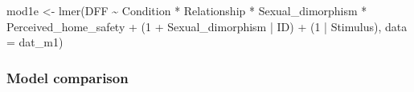 \documentclass[
  bookmarksnumbered]{article}
\newenvironment{Shaded}{\begin{snugshade}}{\end{snugshade}}
\newcommand{\AttributeTok}[1]{\textcolor[rgb]{0.80,0.80,0.80}{#1}}
\newcommand{\DecValTok}[1]{\textcolor[rgb]{0.86,0.86,0.80}{#1}}
\newcommand{\FunctionTok}[1]{\textcolor[rgb]{0.94,0.94,0.56}{#1}}
\newcommand{\NormalTok}[1]{\textcolor[rgb]{0.80,0.80,0.80}{#1}}
\newcommand{\OtherTok}[1]{\textcolor[rgb]{0.94,0.94,0.56}{#1}}
\newcommand{\SpecialCharTok}[1]{\textcolor[rgb]{0.86,0.64,0.64}{#1}}
\newcommand{\StringTok}[1]{\textcolor[rgb]{0.80,0.58,0.58}{#1}}
\begin{document}
\begin{Shaded}
\begin{Highlighting}[]
\NormalTok{mod1e }\OtherTok{\textless{}{-}} \FunctionTok{lmer}\NormalTok{(DFF }\SpecialCharTok{\textasciitilde{}}
\NormalTok{                Condition }\SpecialCharTok{*}\NormalTok{ Relationship }\SpecialCharTok{*}\NormalTok{ Sexual\_dimorphism }\SpecialCharTok{*}\NormalTok{ Perceived\_home\_safety }\SpecialCharTok{+}
\NormalTok{                (}\DecValTok{1} \SpecialCharTok{+}\NormalTok{ Sexual\_dimorphism }\SpecialCharTok{|}\NormalTok{ ID) }\SpecialCharTok{+}\NormalTok{ (}\DecValTok{1} \SpecialCharTok{|}\NormalTok{ Stimulus), }
              \AttributeTok{data =}\NormalTok{ dat\_m1)}
\end{Highlighting}
\end{Shaded}

\subsubsection{Model comparison}\label{model-comparison}

\begin{Shaded}
\end{Shaded}
\end{document}

